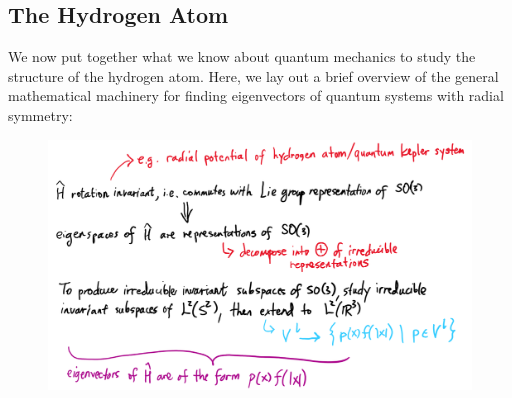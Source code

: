 \subsection{The Hydrogen Atom}
We now put together what we know about quantum mechanics to study the structure of the hydrogen atom. Here, we lay out a brief overview of the general mathematical machinery for finding eigenvectors of quantum systems with radial symmetry:
\begin{figure}[ht]
    \includegraphics[width=\textwidth]{figures/quantum_kepler}
    \centering
\end{figure}
